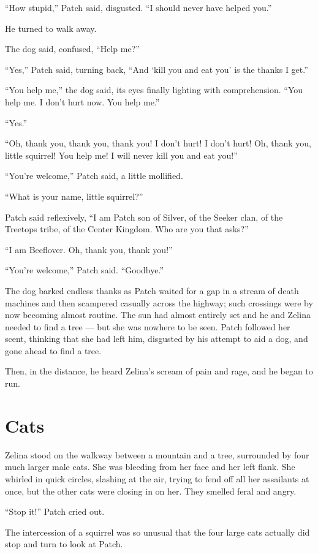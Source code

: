 \documentclass[ebook,oneside,openany,17pt]{memoir}
\newenvironment{tolerant}[1]{%
  \par\tolerance=#1\relax
}{%
  \par
}
\renewcommand{\thechapter}{\Roman{chapter}}
\newcounter{sections}
\newcommand{\sections}[1]{%
  \section*{#1}
  \addtocounter{sections}{1}%
  \pdfbookmark[1]{#1}{section.\thechapter.\thesections}}
\begin{document}
\begin{tolerant}{1000}
“How stupid,” Patch said, disgusted. “I should never have helped you.”
\end{tolerant}

He turned to walk away.

The dog said, confused, “Help me?”

“Yes,” Patch said, turning back, “And ‘kill you and eat you’ is the
thanks I get.”

“You help me,” the dog said, its eyes finally lighting with
comprehension. “You help me. I don’t hurt now. You help me.”

“Yes.”

“Oh, thank you, thank you, thank you! I don’t hurt! I don’t hurt! Oh,
thank you, little squirrel! You help me! I will never kill you and eat
you!”

“You’re welcome,” Patch said, a little mollified.

“What is your name, little squirrel?”

Patch said reflexively, “I am Patch son of Silver, of the Seeker clan,
of the Treetops tribe, of the Center Kingdom. Who are you that asks?”

“I am Beeflover. Oh, thank you, thank you!”

“You’re welcome,” Patch said. “Goodbye.”

The dog barked endless thanks as Patch waited for a gap in a stream of
death machines and then scampered casually across the highway; such
crossings were by now becoming almost routine. The sun had almost
entirely set and he and Zelina needed to find a tree — but she was
nowhere to be seen. Patch followed her scent, thinking that she had
left him, disgusted by his attempt to aid a dog, and gone ahead to
find a tree.

Then, in the distance, he heard Zelina’s scream of pain and rage, and
he began to run.


\sections{Cats}

Zelina stood on the walkway between a mountain and a tree, surrounded
by four much larger male cats. She was bleeding from her face and her
left flank. She whirled in quick circles, slashing at the air, trying
to fend off all her assailants at once, but the other cats were
closing in on her. They smelled feral and angry.

“Stop it!” Patch cried out.

The intercession of a squirrel was so unusual that the four large cats
actually did stop and turn to look at Patch.
\end{document}
